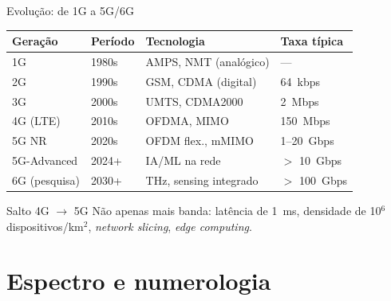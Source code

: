 \documentclass[aspectratio=169,11pt]{beamer}
\begin{document}
\begin{frame}{Evolução: de 1G a 5G/6G}
  \begin{center}
    \scriptsize
    \begin{tabular}{@{}llll@{}}
      \toprule
      \textbf{Geração} & \textbf{Período} & \textbf{Tecnologia} & \textbf{Taxa típica}\\
      \midrule
      1G & 1980s & AMPS, NMT (analógico) & ---\\
      2G & 1990s & GSM, CDMA (digital) & 64~kbps\\
      3G & 2000s & UMTS, CDMA2000 & 2~Mbps\\
      4G (LTE) & 2010s & OFDMA, MIMO & 150~Mbps\\
      5G NR & 2020s & OFDM flex., mMIMO & 1--20~Gbps\\
      5G-Advanced & 2024+ & IA/ML na rede & $>$ 10~Gbps\\
      6G (pesquisa) & 2030+ & THz, sensing integrado & $>$ 100~Gbps\\
      \bottomrule
    \end{tabular}
  \end{center}
  \begin{alertblock}{Salto 4G $\rightarrow$ 5G}
    Não apenas mais banda: latência de 1~ms, densidade de 10$^6$ dispositivos/km$^2$, \emph{network slicing}, \emph{edge computing}.
  \end{alertblock}
\end{frame}

\section{Espectro e numerologia}
\end{document}
